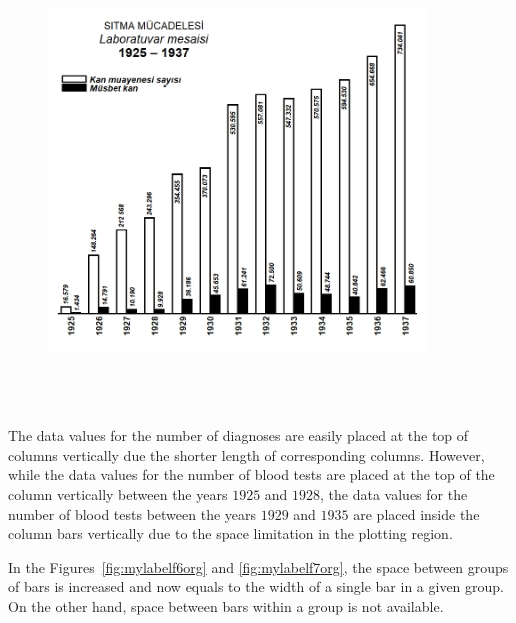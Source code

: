 \begin{figure}[hbt!]
	\centering
	\includegraphics[width=10cm,height=12cm,keepaspectratio]{Sitmarep.png}
\end{figure}


The data values for the number of diagnoses are easily placed at the top of columns vertically due the shorter length of corresponding columns. However, while the data values for the number of blood tests are placed at the top of the column vertically between the years $1925$ and $1928$, the data values for the number of blood tests between the years $1929$ and $1935$ are placed inside the column bars vertically due to the space limitation in the plotting region. 

In the Figures~\ref{fig:mylabelf6org} and \ref{fig:mylabelf7org},  the space between groups of bars is increased and now equals to the width of a single bar in a given group. On the other hand, space between bars within a group is not available. 

